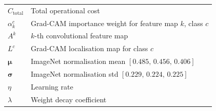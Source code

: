 \documentclass[12pt,a4paper]{report}
\begin{document}
\begin{longtable}{@{} >{\footnotesize}p{3.2cm} >{\footnotesize}p{10.6cm} @{}}
$C_{\text{total}}$    & Total operational cost \\[3pt]
$\alpha_k^c$          & Grad-CAM importance weight for feature map $k$, class $c$ \\[3pt]
$A^k$                 & $k$-th convolutional feature map \\[3pt]
$L^c$                 & Grad-CAM localisation map for class $c$ \\[3pt]
$\boldsymbol{\mu}$    & ImageNet normalisation mean $[0.485,\,0.456,\,0.406]$ \\[3pt]
$\boldsymbol{\sigma}$ & ImageNet normalisation std $[0.229,\,0.224,\,0.225]$ \\[3pt]
$\eta$                & Learning rate \\[3pt]
$\lambda$             & Weight decay coefficient \\[3pt]
\bottomrule
\end{longtable}

\newpage
{}
\setcounter{page}{1}
\pagestyle{fancy}












\end{document}
